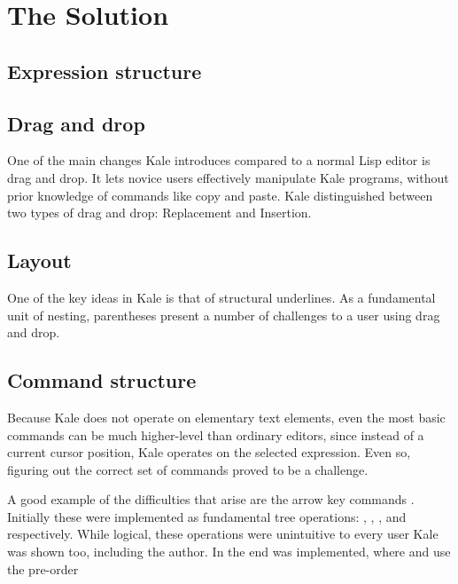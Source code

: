 \documentclass[11pt]{report}
\begin{document}
\chapter{The Solution}

\section{Expression structure}

\section{Drag and drop}

One of the main changes Kale introduces compared to a normal Lisp editor is
drag and drop. It lets novice users effectively manipulate Kale programs,
without prior knowledge of commands like copy and paste. Kale distinguished
between two types of drag and drop: Replacement and Insertion. 

\section{Layout}

One of the key ideas in Kale is that of structural underlines. As a
fundamental unit of nesting, parentheses present a number of challenges to a
user using drag and drop.

\section{Command structure}

Because Kale does not operate on elementary text elements, even the most
basic
commands can be much higher-level than ordinary editors, since instead of a
current cursor position, Kale operates on the selected expression. Even so,
figuring out the correct set of commands proved to be a challenge.

\newcommand{\ak}[1]{\keys{\arrowkey{#1}}}
A good example of the difficulties that arise are the arrow key commands
\ak{^} \ak{v} \ak{<} \ak{>}. Initially these were implemented as
fundamental tree operations: , ,
, and  respectively.
While logical, these operations were unintuitive to every user
Kale was shown too, including the author. In the end  was
implemented, where \ak{<} and \ak{>} use the pre-order
\end{document}
